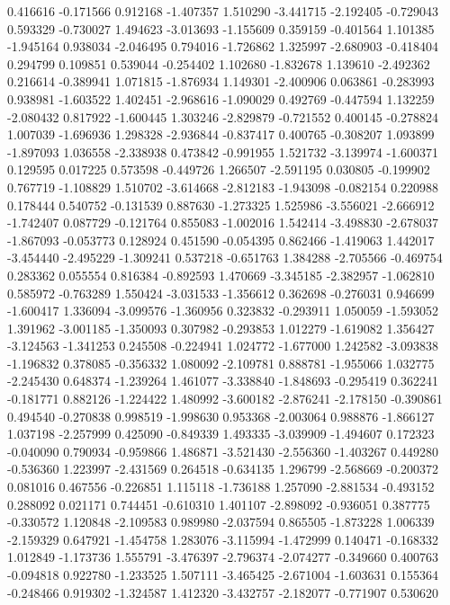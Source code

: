 0.416616
-0.171566
0.912168
-1.407357
1.510290
-3.441715
-2.192405
-0.729043
0.593329
-0.730027
1.494623
-3.013693
-1.155609
0.359159
-0.401564
1.101385
-1.945164
0.938034
-2.046495
0.794016
-1.726862
1.325997
-2.680903
-0.418404
0.294799
0.109851
0.539044
-0.254402
1.102680
-1.832678
1.139610
-2.492362
0.216614
-0.389941
1.071815
-1.876934
1.149301
-2.400906
0.063861
-0.283993
0.938981
-1.603522
1.402451
-2.968616
-1.090029
0.492769
-0.447594
1.132259
-2.080432
0.817922
-1.600445
1.303246
-2.829879
-0.721552
0.400145
-0.278824
1.007039
-1.696936
1.298328
-2.936844
-0.837417
0.400765
-0.308207
1.093899
-1.897093
1.036558
-2.338938
0.473842
-0.991955
1.521732
-3.139974
-1.600371
0.129595
0.017225
0.573598
-0.449726
1.266507
-2.591195
0.030805
-0.199902
0.767719
-1.108829
1.510702
-3.614668
-2.812183
-1.943098
-0.082154
0.220988
0.178444
0.540752
-0.131539
0.887630
-1.273325
1.525986
-3.556021
-2.666912
-1.742407
0.087729
-0.121764
0.855083
-1.002016
1.542414
-3.498830
-2.678037
-1.867093
-0.053773
0.128924
0.451590
-0.054395
0.862466
-1.419063
1.442017
-3.454440
-2.495229
-1.309241
0.537218
-0.651763
1.384288
-2.705566
-0.469754
0.283362
0.055554
0.816384
-0.892593
1.470669
-3.345185
-2.382957
-1.062810
0.585972
-0.763289
1.550424
-3.031533
-1.356612
0.362698
-0.276031
0.946699
-1.600417
1.336094
-3.099576
-1.360956
0.323832
-0.293911
1.050059
-1.593052
1.391962
-3.001185
-1.350093
0.307982
-0.293853
1.012279
-1.619082
1.356427
-3.124563
-1.341253
0.245508
-0.224941
1.024772
-1.677000
1.242582
-3.093838
-1.196832
0.378085
-0.356332
1.080092
-2.109781
0.888781
-1.955066
1.032775
-2.245430
0.648374
-1.239264
1.461077
-3.338840
-1.848693
-0.295419
0.362241
-0.181771
0.882126
-1.224422
1.480992
-3.600182
-2.876241
-2.178150
-0.390861
0.494540
-0.270838
0.998519
-1.998630
0.953368
-2.003064
0.988876
-1.866127
1.037198
-2.257999
0.425090
-0.849339
1.493335
-3.039909
-1.494607
0.172323
-0.040090
0.790934
-0.959866
1.486871
-3.521430
-2.556360
-1.403267
0.449280
-0.536360
1.223997
-2.431569
0.264518
-0.634135
1.296799
-2.568669
-0.200372
0.081016
0.467556
-0.226851
1.115118
-1.736188
1.257090
-2.881534
-0.493152
0.288092
0.021171
0.744451
-0.610310
1.401107
-2.898092
-0.936051
0.387775
-0.330572
1.120848
-2.109583
0.989980
-2.037594
0.865505
-1.873228
1.006339
-2.159329
0.647921
-1.454758
1.283076
-3.115994
-1.472999
0.140471
-0.168332
1.012849
-1.173736
1.555791
-3.476397
-2.796374
-2.074277
-0.349660
0.400763
-0.094818
0.922780
-1.233525
1.507111
-3.465425
-2.671004
-1.603631
0.155364
-0.248466
0.919302
-1.324587
1.412320
-3.432757
-2.182077
-0.771907
0.530620
